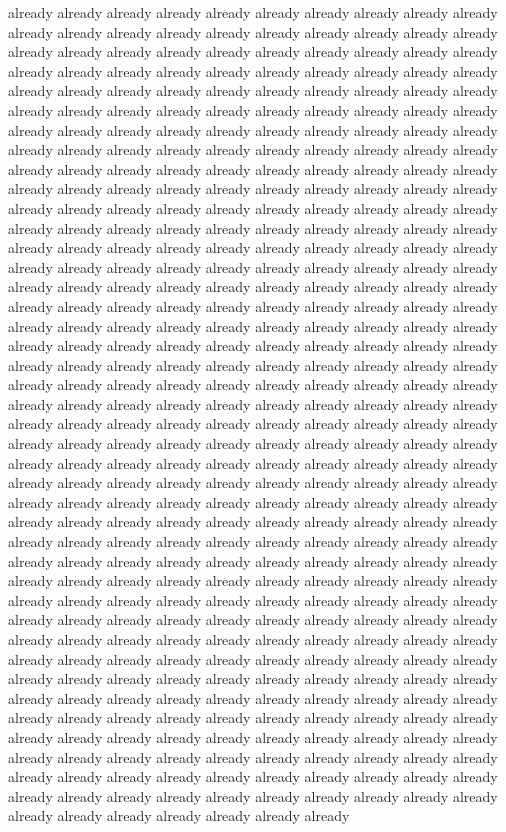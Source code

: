already already already already already already already already already already already already already already already already already already already already already already already already already already already already already already already already already already already already already already already already already already already already already already already already already already already already already already already already already already already already already already already already already already already already already already already already already already already already already already already already already already already already already already already already already already already already already already already already already already already already already already already already already already already already already already already already already already already already already already already already already already already already already already already already already already already already already already already already already already already already already already already already already already already already already already already already already already already already already already already already already already already already already already already already already already already already already already already already already already already already already already already already already already already already already already already already already already already already already already already already already already already already already already already already already already already already already already already already already already already already already already already already already already already already already already already already already already already already already already already already already already already already already already already already already already already already already already already already already already already already already already already already already already already already already already already already already already already already already already already already already already already already already already already already already already already already already already already already already already already already already already already already already already already already already already already already already already already already already already already already already already already already already already already already already already already already already already already already already already already already already already already already already already already already already already already already already already already already already already already already already already already already already already already already already already already already already already already already already already already already already already already already already already already already already already already already already already already already already already already already already already already already already already already already already already already already already already already already already 